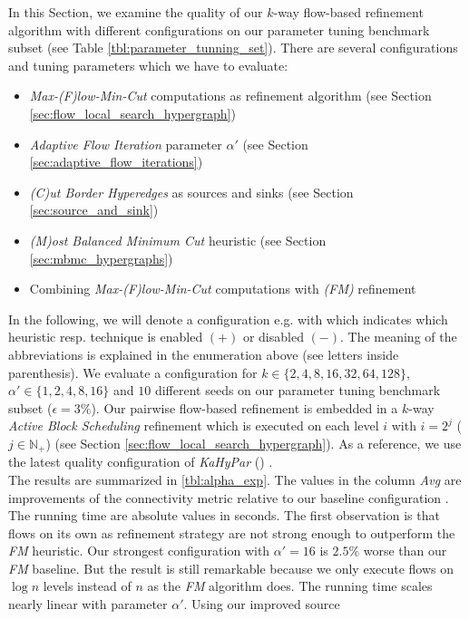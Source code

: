 In this Section, we examine the quality of our $k$-way flow-based refinement algorithm with
different configurations on our parameter tuning benchmark subset (see Table \ref{tbl:parameter_tunning_set}).
There are several configurations and tuning parameters which we have to evaluate:
\begin{itemize}
\item \emph{Max-(F)low-Min-Cut} computations as refinement algorithm (see Section \ref{sec:flow_local_search_hypergraph})
\item \emph{Adaptive Flow Iteration} parameter $\alpha'$ (see Section \ref{sec:adaptive_flow_iterations})
\item \emph{(C)ut Border Hyperedges} as sources and sinks (see Section \ref{sec:source_and_sink})
\item \emph{(M)ost Balanced Minimum Cut} heuristic (see Section \ref{sec:mbmc_hypergraphs})
\item Combining \emph{Max-(F)low-Min-Cut} computations with \emph{(FM)} refinement
\end{itemize}
In the following, we will denote a configuration e.g. with \FlowVariant{+}{-}{-}{-} which indicates
which heuristic resp. technique is enabled $(+)$ or disabled $(-)$. The meaning of the 
abbreviations is explained in the enumeration above (see letters inside parenthesis). We evaluate
a configuration for $k \in \{2,4,8,16,32,64,128\}$, $\alpha' \in \{1,2,4,8,16\}$
and $10$ different seeds on our parameter tuning benchmark subset ($\epsilon = 3\%$). 
Our pairwise flow-based refinement is embedded in a $k$-way \emph{Active Block Scheduling}
refinement which is executed on each level $i$ with $i = 2^j$ ($j \in \mathbb{N}_+$) 
(see Section \ref{sec:flow_local_search_hypergraph}). As a reference, we use the 
latest quality configuration of \emph{KaHyPar} () \cite{heuer2017improving}. \\
The results are summarized in \autoref{tbl:alpha_exp}. The values
in the column \emph{Avg} are improvements of the connectivity metric
relative to our baseline configuration \FlowVariant{-}{-}{-}{+}. The running
time are absolute values in seconds. The first observation is that flows on
its own as refinement strategy are not strong enough to outperform the
\emph{FM} heuristic. Our strongest configuration with $\alpha' = 16$
is $2.5\%$ worse than our \emph{FM} baseline. But the result 
is still remarkable because we only execute flows on $\log{n}$ levels
instead of $n$ as the \emph{FM} algorithm does. The running time
scales nearly linear with parameter $\alpha'$. Using our improved source 
